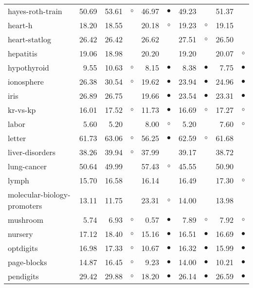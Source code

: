 \begin{table}[thb]
{\begin{tabular}{lrr@{\hspace{0.1cm}}cr@{\hspace{0.1cm}}cr@{\hspace{0.1cm}}cr@{\hspace{0.1cm}}c}
hayes-roth-train & 50.69 & 53.61 &   $\circ$ & 46.97 &  $\bullet$ & 49.23 &            & 51.37 &           \\
heart-h & 18.20 & 18.55 &           & 20.18 &    $\circ$ & 19.23 &    $\circ$ & 19.15 &           \\
heart-statlog & 26.42 & 26.42 &           & 26.62 &            & 27.51 &    $\circ$ & 26.50 &           \\
hepatitis & 19.06 & 18.98 &           & 20.20 &            & 19.20 &            & 20.07 &    $\circ$\\
hypothyroid &  9.55 & 10.63 &   $\circ$ &  8.15 &  $\bullet$ &  8.38 &  $\bullet$ &  7.75 &  $\bullet$\\
ionosphere & 26.38 & 30.54 &   $\circ$ & 19.62 &  $\bullet$ & 23.94 &  $\bullet$ & 24.96 &  $\bullet$\\
iris & 26.89 & 26.75 &           & 19.66 &  $\bullet$ & 23.54 &  $\bullet$ & 23.31 &  $\bullet$\\
kr-vs-kp & 16.01 & 17.52 &   $\circ$ & 11.73 &  $\bullet$ & 16.69 &    $\circ$ & 17.27 &    $\circ$\\
labor &  5.60 &  5.20 &           &  8.00 &    $\circ$ &  5.20 &            &  7.60 &    $\circ$\\
letter & 61.73 & 63.06 &   $\circ$ & 56.25 &  $\bullet$ & 62.59 &    $\circ$ & 61.68 &           \\
liver-disorders & 38.26 & 39.94 &   $\circ$ & 37.99 &            & 39.17 &            & 38.72 &           \\
lung-cancer & 50.64 & 49.99 &           & 57.43 &    $\circ$ & 45.55 &            & 50.90 &           \\
lymph & 15.70 & 16.58 &           & 16.14 &            & 16.49 &            & 17.30 &    $\circ$\\
molecular-biology-promoters & 13.11 & 11.75 &           & 23.31 &    $\circ$ & 14.00 &            & 13.98 &           \\
mushroom &  5.74 &  6.93 &   $\circ$ &  0.57 &  $\bullet$ &  7.89 &    $\circ$ &  7.92 &    $\circ$\\
nursery & 17.12 & 18.40 &   $\circ$ & 15.16 &  $\bullet$ & 16.51 &  $\bullet$ & 16.69 &  $\bullet$\\
optdigits & 16.98 & 17.33 &   $\circ$ & 10.67 &  $\bullet$ & 16.32 &  $\bullet$ & 15.99 &  $\bullet$\\
page-blocks & 14.87 & 16.45 &   $\circ$ &  9.23 &  $\bullet$ & 14.00 &  $\bullet$ & 10.21 &  $\bullet$\\
pendigits & 29.42 & 29.88 &   $\circ$ & 18.20 &  $\bullet$ & 26.14 &  $\bullet$ & 26.59 &  $\bullet$\\

\end{tabular}}
\end{table}

